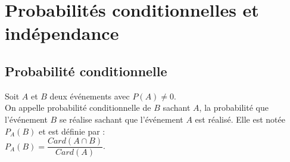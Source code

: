 \chapter{Probabilités conditionnelles et indépendance}
\thispagestyle{fancy}

\section{Probabilité conditionnelle}

\begin{definition}
    Soit $A$ et $B$ deux événements avec $P(A)\neq 0$.\\
    On appelle probabilité conditionnelle de $B$ sachant $A$, la probabilité que l'événement $B$ se réalise sachant que l'événement $A$ est réalisé. Elle est notée $P_A (B)$  et est définie par : \\$P_A(B)= \dfrac{Card(A \cap B)}{Card(A)}$. 
\end{definition}

